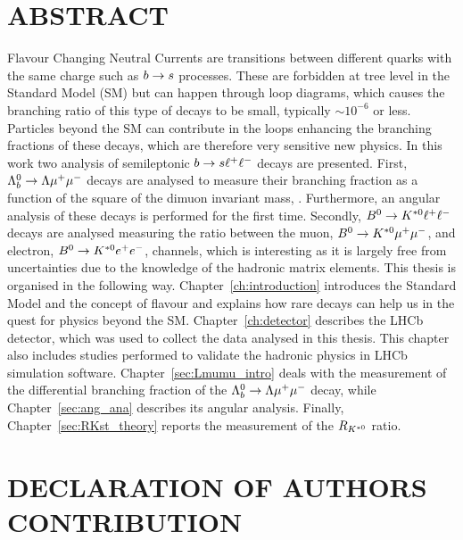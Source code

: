 \chapter*{ABSTRACT}

Flavour Changing Neutral Currents are transitions between different quarks with the same charge such as 
$b\rightarrow s$ processes. These are forbidden at tree level in the Standard Model (SM) but
can happen through loop diagrams, which causes the branching ratio of this type of decays
to be small, typically \mbox{$\sim10^{-6}$} or less. Particles beyond the SM can contribute in the loops enhancing
the branching fractions of these decays, which are therefore very sensitive new physics.
In this work two analysis of semileptonic $b\rightarrow s\ell^+ \ell^-$ decays are presented.
First, $\Lambda^0_b\rightarrow\Lambda\mu^+\mu^-$ decays are analysed to measure their branching fraction as a function
of the square of the dimuon invariant mass, \qsq. Furthermore, an angular analysis of these decays is performed for the first time. 
Secondly, $B^0\rightarrow K^{*0}\ell^+ \ell^-$ decays are analysed measuring the \RKst ratio between the muon, $B^0\rightarrow K^{*0}\mu^+\mu^-$, 
and electron, $B^0\rightarrow K^{*0}e^+ e^-$, channels, which is interesting as it is largely free
from uncertainties due to the knowledge of the hadronic matrix elements.
This thesis is organised in the following way. Chapter~\ref{ch:introduction} introduces the Standard Model and 
the concept of flavour and explains how rare decays can help us in the quest for physics beyond the SM.
Chapter~\ref{ch:detector} describes the LHCb detector, which was used to collect the data analysed in this thesis.
This chapter also includes studies performed to validate the hadronic physics in LHCb simulation software.
Chapter~\ref{sec:Lmumu_intro} deals with the measurement of the differential branching fraction of the $\Lambda^0_b\rightarrow\Lambda\mu^+\mu^-$ 
decay, while Chapter~\ref{sec:ang_ana} describes its angular analysis.
Finally, Chapter~\ref{sec:RKst_theory} reports the measurement of the $R_{K^{*0}}$ ratio.

\clearpage

\chapter*{DECLARATION OF AUTHORS CONTRIBUTION}

